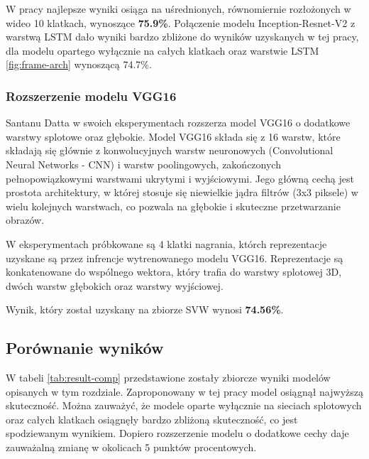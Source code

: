 W pracy najlepsze wyniki osiąga na uśrednionych, równomiernie rozłożonych w wideo 10 klatkach, wynoszące \textbf{75.9\%}. Połączenie modelu Inception-Resnet-V2 z warstwą LSTM dało wyniki bardzo zbliżone do wyników uzyskanych w tej pracy, dla modelu opartego wyłącznie na całych klatkach oraz warstwie LSTM \ref{fig:frame-arch} wynoszącą 74.7\%. 

\subsubsection{Rozszerzenie modelu VGG16}
Santanu Datta \cite{kumar} w swoich eksperymentach rozszerza model VGG16 \cite{vgg16} o dodatkowe warstwy splotowe oraz głębokie. Model VGG16 składa się z 16 warstw, które składają się głównie z konwolucyjnych warstw neuronowych (Convolutional Neural Networks - CNN) i warstw poolingowych, zakończonych pełnopowiązkowymi warstwami ukrytymi i wyjściowymi. Jego główną cechą jest prostota architektury, w której stosuje się niewielkie jądra filtrów (3x3 piksele) w wielu kolejnych warstwach, co pozwala na głębokie i skuteczne przetwarzanie obrazów. 

W eksperymentach próbkowane są 4 klatki nagrania, którch reprezentacje uzyskane są przez infrencje wytrenowanego modelu VGG16. Reprezentacje są konkatenowane do wspólnego wektora, który trafia do warstwy splotowej 3D, dwóch warstw głębokich oraz warstwy wyjściowej.

Wynik, który został uzyskany na zbiorze SVW \cite{svw} wynosi \textbf{74.56\%}. 
\subsection{Porównanie wyników}
W tabeli \ref{tab:result-comp} przedstawione zostały zbiorcze wyniki modelów opisanych w tym rozdziale. Zaproponowany w tej pracy model osiągnął najwyższą skuteczność. Można zauważyć, że modele oparte wyłącznie na sieciach splotowych oraz całych klatkach osiągnęły bardzo zbliżoną skuteczność, co jest spodziewanym wynikiem. Dopiero rozszerzenie modelu o dodatkowe cechy daje zauważalną zmianę w okolicach 5 punktów procentowych. 

